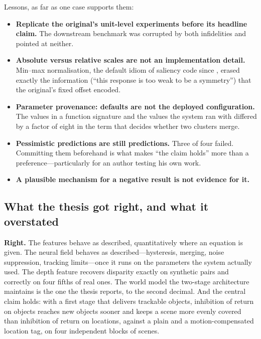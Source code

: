 \documentclass[11pt,a4paper]{article}
\begin{document}
Lessons, as far as one case supports them:
\begin{itemize}
  \item \textbf{Replicate the original's unit-level experiments before its
        headline claim.} The downstream benchmark was corrupted by both
        infidelities and pointed at neither.
  \item \textbf{Absolute versus relative scales are not an implementation
        detail.} Min--max normalisation, the default idiom of saliency code since
        \citet{itti1998}, erased exactly the information (``this response is too
        weak to be a symmetry'') that the original's fixed offset encoded.
  \item \textbf{Parameter provenance: defaults are not the deployed
        configuration.} The values in a function signature and the values the
        system ran with differed by a factor of eight in the term that decides
        whether two clusters merge.
  \item \textbf{Pessimistic predictions are still predictions.} Three of four
        failed. Committing them beforehand is what makes ``the claim holds''
        more than a preference---particularly for an author testing his own work.
  \item \textbf{A plausible mechanism for a negative result is not evidence for
        it.}
\end{itemize}

\subsection{What the thesis got right, and what it overstated}
\textbf{Right.} The features behave as described, quantitatively where an
equation is given. The neural field behaves as described---hysteresis, merging,
noise suppression, tracking limits---once it runs on the parameters the system
actually used. The depth feature recovers disparity exactly on synthetic pairs
and correctly on four fifths of real ones. The world model the two-stage
architecture maintains is the one the thesis reports, to the second decimal.
And the central claim holds: with a first stage that delivers trackable objects,
inhibition of return on objects reaches new objects sooner and keeps a scene more
evenly covered than inhibition of return on locations, against a plain and a
motion-compensated location tag, on four independent blocks of scenes.
\end{document}
